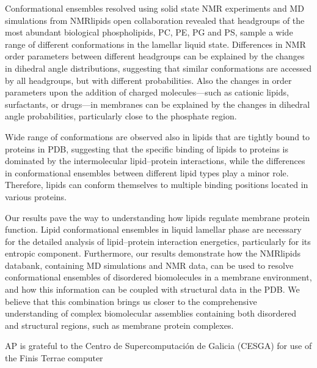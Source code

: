 \documentclass[aps,prl,superscriptaddress,twocolumn]{revtex4}
\begin{document}
Conformational ensembles resolved using solid state NMR experiments and MD simulations
from NMRlipids open collaboration revealed that headgroups of the most abundant biological
phospholipids, PC, PE, PG and PS, sample a wide range of different conformations in the lamellar liquid state.
Differences in NMR order parameters between different headgroups can be explained
by the changes in dihedral angle distributions, suggesting that
similar conformations are accessed by all headgroups, but with different probabilities.
Also the changes in order parameters upon the addition of charged molecules---such as cationic lipids, surfactants, or drugs---in membranes can be explained by the changes in dihedral angle probabilities, particularly close to the phosphate region.

Wide range of conformations are observed also in lipids that are tightly bound to proteins in PDB,
suggesting that the specific binding of lipids to proteins is dominated by the intermolecular lipid--protein
interactions, while the differences in conformational ensembles between different lipid types
play a minor role. Therefore, lipids can conform themselves to multiple binding positions located
in various proteins.

Our results pave the way to understanding how lipids regulate membrane protein function.
Lipid conformational ensembles in liquid lamellar phase are necessary
for the detailed analysis of lipid--protein interaction energetics, particularly for its entropic component. 
Furthermore, our results demonstrate how the NMRlipids databank, containing MD simulations and NMR data,
can be used to resolve conformational ensembles of disordered biomolecules in a membrane environment,
and how this information can be coupled with structural data in the PDB.
We believe that this combination brings us closer to the comprehensive understanding of
complex biomolecular assemblies containing both disordered and structural regions, such as membrane
protein complexes.

\begin{acknowledgments}
AP is grateful to the Centro de
Supercomputación de Galicia (CESGA) for use of the Finis
Terrae computer
\end{acknowledgments}





\listoftodos
\end{document}
